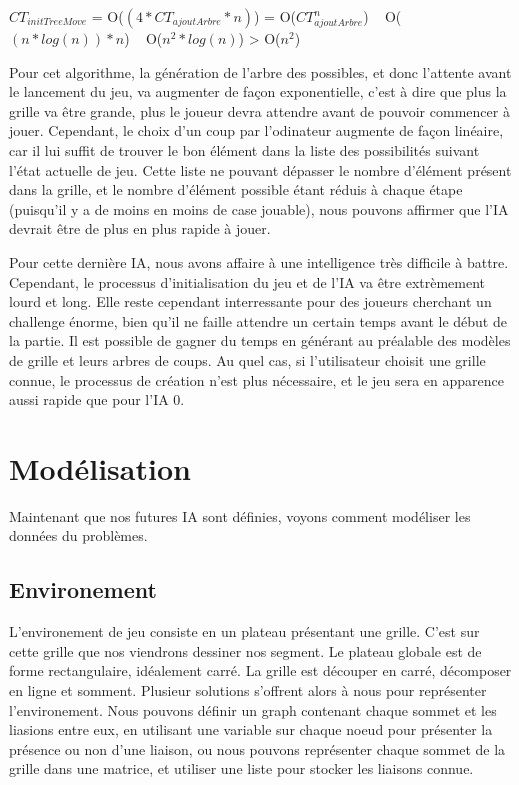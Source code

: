 \documentclass[a4paper,12pt]{report}
\begin{document}
$CT_{initTreeMove}$ = O($(4*CT_{ajoutArbre}*n)$) = O($CT_{ajoutArbre}^n$) ~ O($(n*log(n))*n$) ~ O($n^2*log(n)$) > O($n^2$)

Pour cet algorithme, la g\'en\'eration de l'arbre des possibles, et donc l'attente avant le lancement du jeu, va augmenter de fa\c{c}on exponentielle, c'est \`a dire que plus la grille va \^etre grande, plus le joueur devra attendre avant de pouvoir commencer \`a jouer. Cependant, le choix d'un coup par l'odinateur augmente de fa\c{c}on lin\'eaire, car il lui suffit de trouver le bon \'el\'ement dans la liste des possibilit\'es suivant l'\'etat actuelle de jeu. Cette liste ne pouvant d\'epasser le nombre d'\'el\'ement pr\'esent dans la grille, et le nombre d'\'el\'ement possible \'etant r\'eduis \`a chaque \'etape (puisqu'il y a de moins en moins de case jouable), nous pouvons affirmer que l'IA devrait \^etre de plus en plus rapide \`a jouer.

Pour cette derni\`ere IA, nous avons affaire \`a une intelligence tr\`es difficile \`a battre. Cependant, le processus d'initialisation du jeu et de l'IA va \^etre extr\`emement lourd et long. Elle reste cependant interressante pour des joueurs cherchant un challenge \'enorme, bien qu'il ne faille attendre un certain temps avant le d\'ebut de la partie. Il est possible de gagner du temps en g\'en\'erant au pr\'ealable des mod\`eles de grille et leurs arbres de coups. Au quel cas, si l'utilisateur choisit une grille connue, le processus de cr\'eation n'est plus n\'ecessaire, et le jeu sera en apparence aussi rapide que pour l'IA 0.



\part{Mod\'elisation}

Maintenant que nos futures IA sont d\'efinies, voyons comment mod\'eliser les donn\'ees du probl\`emes.

\chapter{Environement}

L'environement de jeu consiste en un plateau pr\'esentant une grille. C'est sur cette grille que nos viendrons dessiner nos segment. Le plateau globale est de forme rectangulaire, id\'ealement carr\'e. La grille est d\'ecouper en carr\'e, d\'ecomposer en ligne et somment. Plusieur solutions s'offrent alors \`a nous pour repr\'esenter l'environement. Nous pouvons d\'efinir un graph contenant chaque sommet et les liasions entre eux, en utilisant une variable sur chaque noeud pour pr\'esenter la pr\'esence ou non d'une liaison, ou nous pouvons repr\'esenter chaque sommet de la grille dans une matrice, et utiliser une liste pour stocker les liaisons connue. \\
\end{document}
